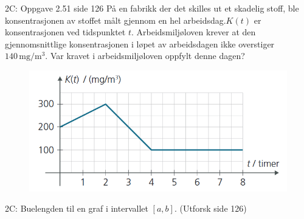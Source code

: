 \greenheader
\begin{frame}{2C: Oppgave 2.51 side 126}
    På en fabrikk der det skilles ut et skadelig stoff, ble konsentrasjonen av stoffet målt gjennom en hel arbeidsdag.\(K(t)\) er konsentrasjonen ved tidspunktet \(t\). Arbeidsmiljøloven krever at den gjennomsnittlige konsentrasjonen i løpet av arbeidsdagen ikke overstiger \(140\,\mathrm{mg}/\mathrm{m}^3\). Var kravet i arbeidsmiljøloven oppfylt denne dagen?

\begin{figure}
    \centering
    \includegraphics[width=0.6\linewidth]{R2-K2B-13.png}
\end{figure}
\end{frame}

\magentaheader
\begin{frame}{2C: Buelengden til en graf i intervallet $[a, b]$. (Utforsk side 126)}
\end{frame}



